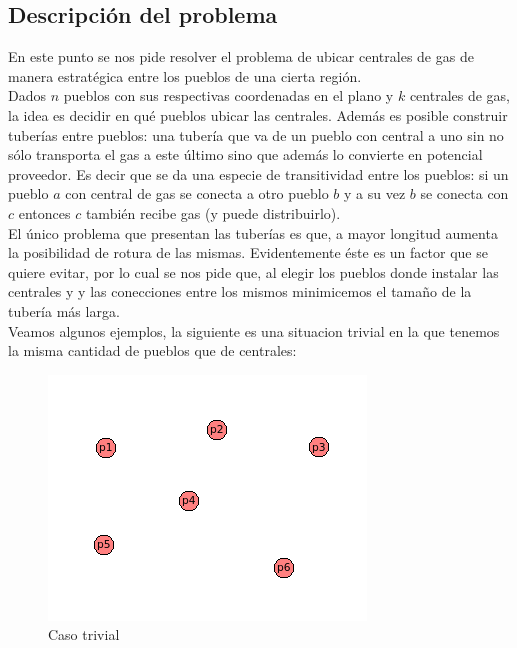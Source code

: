 \subsection{Descripci\'on del problema}

En este punto se nos pide resolver el problema de ubicar centrales de gas de manera estrat\'egica entre los pueblos de una cierta regi\'on.\\

Dados $n$ pueblos con sus respectivas coordenadas en el plano y $k$ centrales de gas, la idea es decidir en qu\'e pueblos ubicar las centrales. Adem\'as es posible construir tuber\'ias entre pueblos: una tuber\'ia que va de un pueblo con central a uno sin no s\'olo transporta el gas a este \'ultimo sino que adem\'as lo convierte en potencial proveedor. Es decir que se da una especie de transitividad entre los pueblos: si un pueblo $a$ con central de gas se conecta a otro pueblo $b$ y a su vez $b$ se conecta con $c$ entonces $c$ tambi\'en recibe gas (y puede distribuirlo).\\

El \'unico problema que presentan las tuber\'ias es que, a mayor longitud aumenta la posibilidad de rotura de las mismas. Evidentemente \'este es un factor que se quiere evitar, por lo cual se nos pide que, al elegir los pueblos donde instalar las centrales y y las conecciones entre los mismos minimicemos el tama\~no de la tuber\'ia m\'as larga.\\

Veamos algunos ejemplos, la siguiente es una situacion trivial en la que tenemos la misma cantidad de pueblos que de centrales:

\begin{figure}[h]
\begin{center}
\includegraphics[scale=0.7]{./img/ej2_explicacion1.png}
\caption{Caso trivial}
\end{center}
\end{figure}

